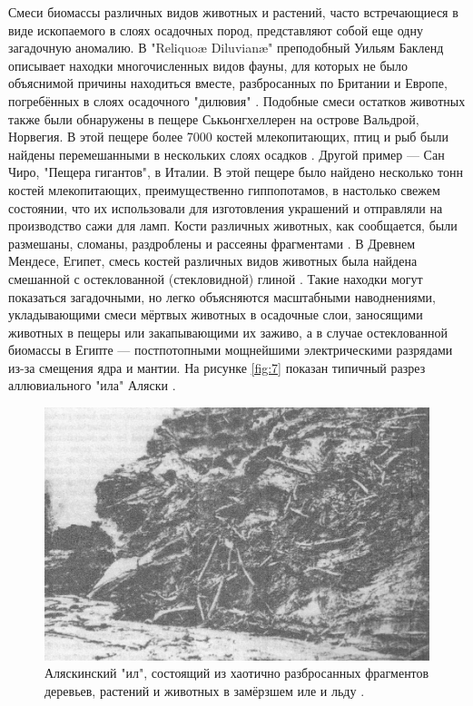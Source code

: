 \documentclass[10pt,twocolumn,letterpaper]{article}
\begin{document}
Смеси биомассы различных видов животных и растений, часто встречающиеся в виде ископаемого в слоях осадочных пород, представляют собой еще одну загадочную аномалию. В "Reliquoæ Diluvianæ" преподобный Уильям Бакленд описывает находки многочисленных видов фауны, для которых не было объяснимой причины находиться вместе, разбросанных по Британии и Европе, погребённых в слоях осадочного "дилювия" \cite{58}. Подобные смеси остатков животных также были обнаружены в пещере Ськьонгхеллерен на острове Вальдрой, Норвегия. В этой пещере более 7000 костей млекопитающих, птиц и рыб были найдены перемешанными в нескольких слоях осадков \cite{59}. Другой пример — Сан Чиро, "Пещера гигантов", в Италии. В этой пещере было найдено несколько тонн костей млекопитающих, преимущественно гиппопотамов, в настолько свежем состоянии, что их использовали для изготовления украшений и отправляли на производство сажи для ламп. Кости различных животных, как сообщается, были размешаны, сломаны, раздроблены и рассеяны фрагментами \cite{60,61}. В Древнем Мендесе, Египет, смесь костей различных видов животных была найдена смешанной с остеклованной (стекловидной) глиной \cite{57}. Такие находки могут показаться загадочными, но легко объясняются масштабными наводнениями, укладывающими смеси мёртвых животных в осадочные слои, заносящими животных в пещеры или закапывающими их заживо, а в случае остеклованной биомассы в Египте — постпотопными мощнейшими электрическими разрядами из-за смещения ядра и мантии. На рисунке \ref{fig:7} показан типичный разрез аллювиального "ила" Аляски \cite{56}.

\begin{figure}[t]
\begin{center}
   \includegraphics[width=1\linewidth]{muck-crop.jpeg}
\end{center}
   \caption{Аляскинский "ил", состоящий из хаотично разбросанных фрагментов деревьев, растений и животных в замёрзшем иле и льду \cite{146}.}
\label{fig:7}
\label{fig:onecol}
\end{figure}
\end{document}
